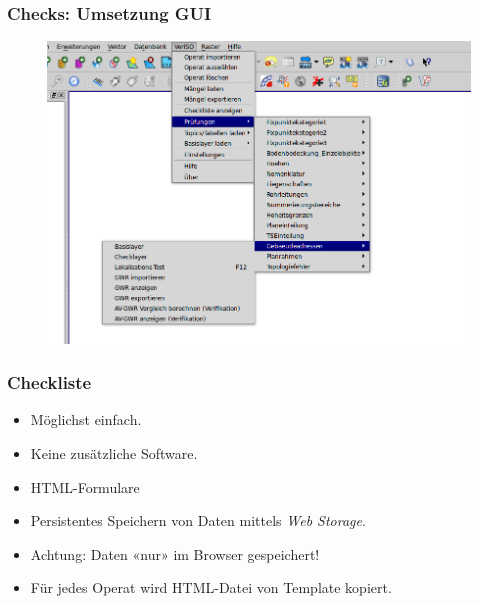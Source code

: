 \documentclass{beamer}
\begin{document}
\begin{frame}
  \frametitle{Checks: Umsetzung GUI}
  \begin{figure}
    \includegraphics[scale=0.35]{bilder/veriso_checks_3.png}
  \end{figure}
\end{frame}




\begin{frame}[fragile]
  \frametitle{Checkliste}
  \begin{itemize}
  \item Möglichst einfach.
  \item Keine zusätzliche Software.
  \item HTML-Formulare
  \item Persistentes Speichern von Daten mittels \textit{Web Storage}.
  \item Achtung: Daten «nur» im Browser gespeichert!
  \item Für jedes Operat wird HTML-Datei von Template kopiert.
  \end{itemize}
\end{frame}
\end{document}
